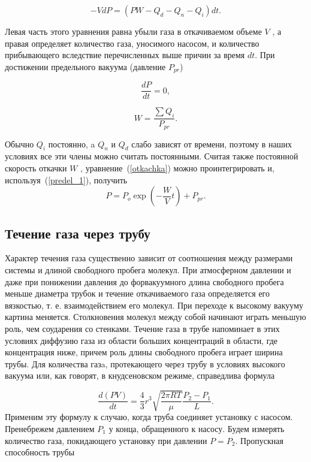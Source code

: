 \documentclass[a4paper, 12pt]{article}%
\begin{document}
\begin{equation}
\label{otkachka}
	-VdP=(PW-Q_d-Q_n-Q_i)dt.
\end{equation}

Левая часть этого уравнения равна убыли газа в откачиваемом объеме $V$ , а правая определяет количество газа, уносимого насосом, и количество прибывающего вследствие перечисленных выше причин
за время $dt$. При достижении предельного вакуума (давление $P_{pr}$)

\begin{equation}
\label{predel_1}
	\frac{dP}{dt}=0,
\end{equation}

\begin{equation}
\label{predel_2}
	W=\frac{\sum Q_i}{P_{pr}}.
\end{equation}

Обычно $Q_i$ постоянно, a $Q_n$ и $Q_d$ слабо зависят от времени, поэтому в наших условиях все эти члены можно считать постоянными. Считая также постоянной скорость откачки $W$ , уравнение~(\ref{otkachka}) можно проинтегрировать и, используя~(\ref{predel_1}), получить
\begin{equation}
\label{davlenie}
	P = P_o \exp{(-\frac{W}{V} t)} + P_{pr}.
\end{equation}


\subsection{Течение газа через трубу}
	Характер течения газа существенно зависит от соотношения между размерами системы и длиной свободного пробега молекул. При атмосферном давлении и даже при понижении давления до форвакуумного длина свободного пробега меньше диаметра трубок и течение откачиваемого газа определяется его вязкостью, т. е. взаимодействием его молекул. При переходе к высокому вакууму картина меняется. Столкновения молекул между собой начинают играть меньшую роль, чем соударения со стенками. Течение газа в трубе напоминает в этих условиях диффузию газа из области больших концентраций в области, где концентрация ниже, причем роль длины свободного пробега играет ширина трубы.
Для количества газa, протекающего через трубу в условиях высокого вакуума или, как говорят, в кнудсеновском режиме, справедлива формула

\begin{equation}
\label{formula}
	\frac{d(PV)}{dt}=\frac{4}{3}r^3 \sqrt{\frac{2\pi RT}{\mu}} \frac{P_2-P_1}{L}.
\end{equation}
Применим эту формулу к случаю, когда труба соединяет установку с насосом.
Пренебрежем давлением $P_1$ у конца, обращенного к насосу. Будем измерять количество газа, покидающего установку при давлении $P = P_2$. Пропускная способность трубы
\end{document}
